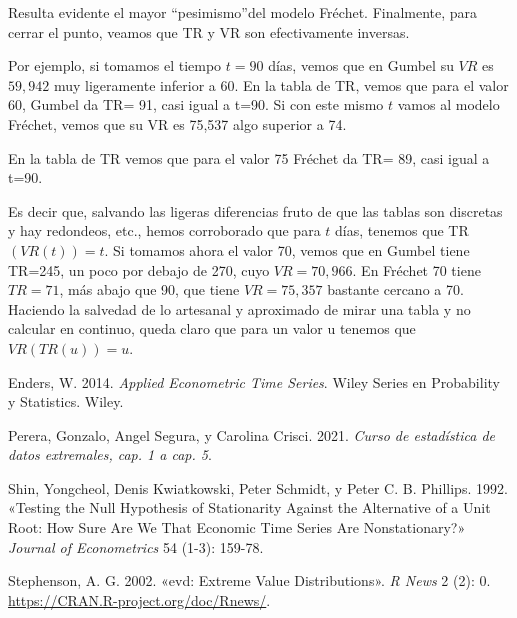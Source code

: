 \documentclass[
  oneside]{article}
\newlength{\cslhangindent}
\newlength{\cslentryspacingunit} %
\newenvironment{CSLReferences}[2] %
 {%
  \setlength{\parindent}{0pt}
  \ifodd #1
  \let\oldpar\par
  \def\par{\hangindent=\cslhangindent\oldpar}
  \fi
  \setlength{\parskip}{#2\cslentryspacingunit}
 }%
 {}
\begin{document}
Resulta evidente el mayor ``pesimismo''del modelo Fréchet. Finalmente,
para cerrar el punto, veamos que TR y VR son efectivamente inversas.

Por ejemplo, si tomamos el tiempo \(t=90\) días, vemos que en Gumbel su
\(VR\) es \(59,942\) muy ligeramente inferior a 60. En la tabla de TR,
vemos que para el valor 60, Gumbel da TR= 91, casi igual a t=90. Si con
este mismo \(t\) vamos al modelo Fréchet, vemos que su VR es 75,537 algo
superior a 74.

En la tabla de TR vemos que para el valor 75 Fréchet da TR= 89, casi
igual a t=90.

Es decir que, salvando las ligeras diferencias fruto de que las tablas
son discretas y hay redondeos, etc., hemos corroborado que para \(t\)
días, tenemos que TR \((VR(t))=t\). Si tomamos ahora el valor 70, vemos
que en Gumbel tiene TR=245, un poco por debajo de 270, cuyo
\(VR=70,966\). En Fréchet 70 tiene \(TR=71\), más abajo que 90, que
tiene \(VR= 75,357\) bastante cercano a 70. Haciendo la salvedad de lo
artesanal y aproximado de mirar una tabla y no calcular en continuo,
queda claro que para un valor u tenemos que \(VR(TR(u))=u\).

\hypertarget{refs}{}
\begin{CSLReferences}{1}{0}
\leavevmode{}%
Enders, W. 2014. \emph{Applied Econometric Time Series}. Wiley Series en
Probability y Statistics. Wiley.

\leavevmode{}%
Perera, Gonzalo, Angel Segura, y Carolina Crisci. 2021. \emph{Curso de
estadística de datos extremales, cap. 1 a cap. 5}.

\leavevmode{}%
Shin, Yongcheol, Denis Kwiatkowski, Peter Schmidt, y Peter C. B.
Phillips. 1992. {«Testing the Null Hypothesis of Stationarity Against
the Alternative of a Unit Root: How Sure Are We That Economic Time
Series Are Nonstationary?»} \emph{Journal of Econometrics} 54 (1-3):
159-78.

\leavevmode{}%
Stephenson, A. G. 2002. {«evd: Extreme Value Distributions»}. \emph{R
News} 2 (2): 0. \url{https://CRAN.R-project.org/doc/Rnews/}.

\end{CSLReferences}
\end{document}
